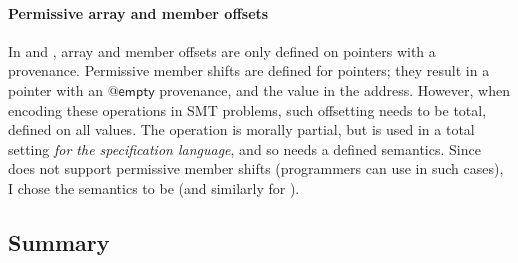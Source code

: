 \paragraph{Permissive array and member offsets}%
In  and , array and member offsets are only defined on
pointers with a provenance. Permissive member shifts are defined for
 pointers; they result in a pointer with an $@\mathsf{empty}$
provenance, and the  value in the address. However, when
encoding these operations in SMT problems, such offsetting needs to be total,
defined on all values. The operation is morally partial, but is used in a total
setting \emph{for the specification language}, and so needs a defined
semantics. Since  does not support permissive member shifts (programmers
can use  in such cases), I chose the semantics to be
 (and similarly %
for ).

\subsection{Summary}

